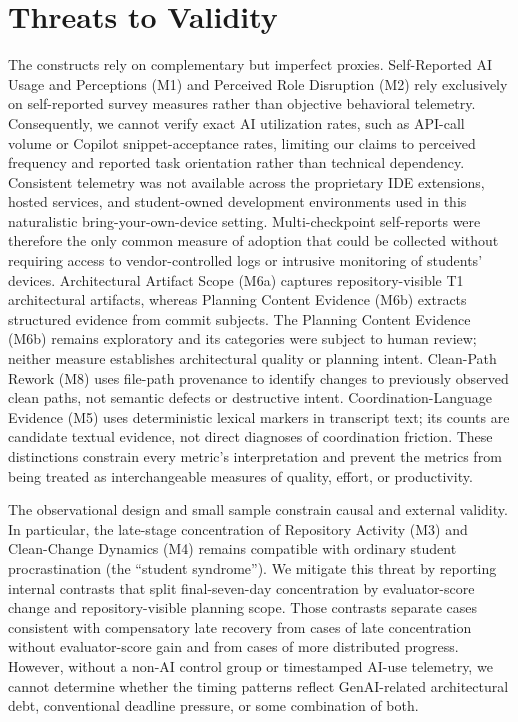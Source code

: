 \section{Threats to Validity}
The constructs rely on complementary but imperfect proxies. Self-Reported AI
Usage and Perceptions (M1) and Perceived Role Disruption (M2) rely exclusively
on self-reported survey measures rather than objective behavioral telemetry.
Consequently, we cannot verify exact AI utilization rates, such as API-call
volume or Copilot snippet-acceptance rates, limiting our claims to perceived
frequency and reported task orientation rather than technical dependency.
Consistent telemetry was not available across the proprietary IDE extensions,
hosted services, and student-owned development environments used in this
naturalistic bring-your-own-device setting. Multi-checkpoint self-reports were
therefore the only common measure of adoption that could be collected without
requiring access to vendor-controlled logs or intrusive monitoring of students'
devices.
Architectural Artifact Scope (M6a)
captures repository-visible T1 architectural artifacts, whereas Planning
Content Evidence (M6b) extracts structured evidence from commit subjects. The
Planning Content Evidence (M6b) remains exploratory and its categories were
subject to human review; neither measure establishes architectural quality or
planning intent. Clean-Path Rework (M8) uses file-path provenance to identify
changes to previously observed clean paths, not semantic defects or destructive
intent. Coordination-Language Evidence (M5) uses deterministic lexical markers
in transcript text; its counts are candidate
textual evidence, not direct diagnoses of coordination friction. These
distinctions constrain every metric's interpretation and prevent the metrics
from being treated as interchangeable measures of quality, effort, or
productivity.

The observational design and small sample constrain causal and external
validity. In particular, the late-stage concentration of Repository Activity
(M3) and Clean-Change Dynamics (M4) remains compatible with ordinary student
procrastination (the ``student syndrome''). We mitigate this threat by reporting
internal contrasts that split final-seven-day concentration by evaluator-score
change and repository-visible planning scope. Those contrasts separate cases
consistent with compensatory late recovery from cases of late concentration
without evaluator-score gain and from cases of more distributed progress.
However, without a non-AI control group or timestamped AI-use telemetry, we
cannot determine whether the timing patterns reflect GenAI-related
architectural debt, conventional deadline pressure, or some combination of
both.

